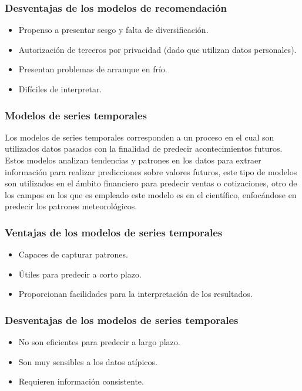 \subsubsection{Desventajas de los modelos de recomendación}
\begin{itemize}
    \item Propenso a presentar sesgo y falta de diversificación.
    \item Autorización de terceros por privacidad (dado que utilizan datos personales).
    \item Presentan problemas de arranque en frío.
    \item Difíciles de interpretar.
\end{itemize}

\subsubsection{Modelos de series temporales}
 
Los modelos de series temporales corresponden a un proceso en el cual son utilizados datos pasados con la finalidad de predecir acontecimientos futuros. Estos modelos analizan tendencias y patrones en los datos para extraer información para realizar predicciones sobre valores futuros, este tipo de modelos son utilizados en el ámbito financiero para predecir ventas o cotizaciones, otro de los campos en los que es empleado este modelo es en el científico, enfocándose en predecir los patrones meteorológicos. 

\subsubsection{Ventajas de los modelos de series temporales}
\begin{itemize}
    \item Capaces de capturar patrones.
    \item Útiles para predecir a corto plazo.
    \item Proporcionan facilidades para la interpretación de los resultados.
\end{itemize}

\subsubsection{Desventajas de los modelos de series temporales}
\begin{itemize}
    \item No son eficientes para predecir a largo plazo.
    \item Son muy sensibles a los datos atípicos.
    \item Requieren información consistente.
\end{itemize}


